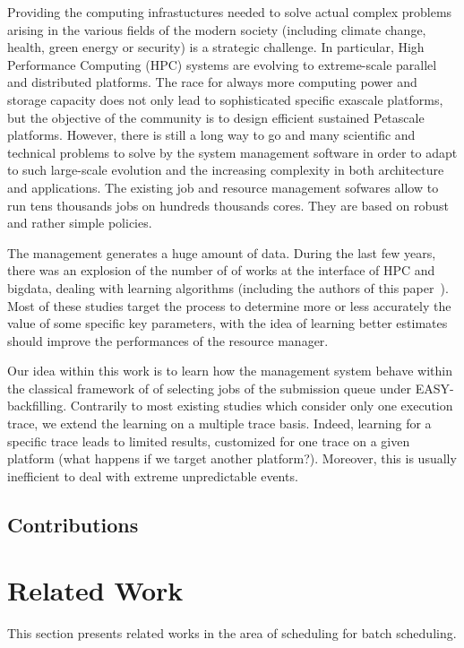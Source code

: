 \documentclass[sigconf]{acmart}
\begin{document}
Providing the computing infrastuctures needed to solve actual complex problems
arising in the various fields of the modern society (including climate change,
health, green energy or security) is a strategic challenge.
In particular, High Performance Computing (HPC) systems are evolving to
extreme-scale parallel and distributed platforms.
The race for always more computing power and storage capacity does not only
lead to sophisticated specific exascale platforms, but the objective of the
community is to design efficient sustained Petascale platforms.
However, there is still a long way to go and many scientific and technical
problems to solve by the system management software in order to adapt to such
large-scale evolution and the increasing complexity
in both architecture and applications.
The existing job and resource management sofwares allow to run tens thousands
jobs on hundreds thousands cores.
They are based on robust and rather simple policies.

\bigskip
The management generates a huge amount of data.
During the last few years, there was an explosion of the number of of works at
the interface of HPC and bigdata, dealing with learning algorithms
(including the authors of this paper~\cite{learningruntimes}).
Most of these studies target the process to determine more or less accurately
the value of some specific key parameters, with the idea of
learning better estimates should improve the performances of the resource
manager.

\bigskip
Our idea within this work is to learn how the management system behave within
the classical framework of of selecting jobs of the submission queue under
EASY-backfilling.
Contrarily to most existing studies which consider only one execution trace, we
extend the learning on a multiple trace basis.
Indeed, learning for a specific trace leads to limited results, customized for
one trace on a given platform (what happens if we target another platform?).
Moreover, this is usually inefficient to deal with extreme unpredictable
events.

\subsection{Contributions}

\section{Related Work}
\label{sec:rw}

This section presents related works in the area of scheduling for batch scheduling.
\end{document}
